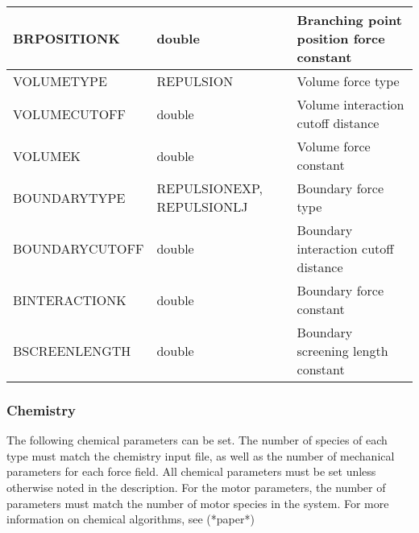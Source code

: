 \documentclass[11pt, oneside]{article}   	%
\begin{document}
\begin{longtable}{|L{4.65cm}|C{4cm}|L{4cm}|}
  \hline
   BRPOSITIONK & double & Branching point position force constant \\
  \hline
   VOLUMETYPE & REPULSION & Volume force type \\
  \hline
   VOLUMECUTOFF & double & Volume interaction cutoff distance\\
  \hline
  VOLUMEK & double & Volume force constant \\
  \hline
  BOUNDARYTYPE & REPULSIONEXP, REPULSIONLJ & Boundary force type \\
  \hline
   BOUNDARYCUTOFF & double & Boundary interaction cutoff distance\\
  \hline
  BINTERACTIONK & double & Boundary force constant \\
  \hline
  BSCREENLENGTH & double & Boundary screening length constant\\
  \hline
 
\end{longtable}

\subsubsection{Chemistry}

The following chemical parameters can be set. The number of species of each type must match the chemistry input file, as well as the number of mechanical parameters for each force field. All chemical parameters must be set unless otherwise noted in the description. For the motor parameters, the number of parameters must match the number of motor species in the system. For more information on chemical algorithms, see (*paper*)
\end{document}
